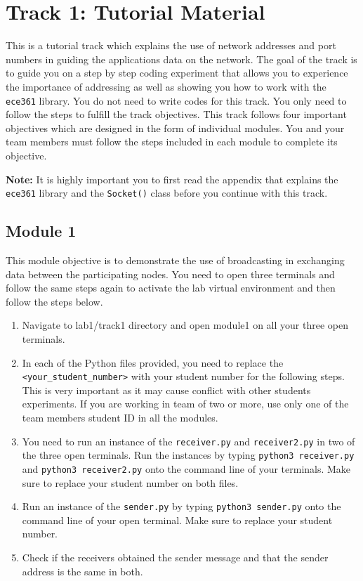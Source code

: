 \documentclass[11pt]{article}
\begin{document}
\section{Track 1: Tutorial Material}
\label{sec:track1}
This is a tutorial track which explains the use of network addresses and port numbers in guiding the applications data on the network. The goal of the track is to guide you on a step by step coding experiment that allows you to experience the importance of addressing as well as showing you how to work with the \texttt{ece361} library. You do not need to write codes for this track. You only need to follow the steps to fulfill the track objectives. This track follows four important objectives which are designed in the form of individual modules. You and your team members must follow the steps included in each module to complete its objective.

\textbf{Note:}
It is highly important you to first read the appendix that explains the \texttt{ece361} library and the \texttt{Socket()} class before you continue with this track.

\subsection{Module 1}
\label{subsec:module1}
This module objective is to demonstrate the use of broadcasting in exchanging data between the participating nodes. You need to open three terminals and follow the same steps again to activate the lab virtual environment and then follow the steps below.
\begin{enumerate}
    \item Navigate to lab1/track1 directory and open module1 on all your three open terminals.
    \item In each of the Python files provided, you need to replace the \texttt{<your\_student\_number>} with your student number for the following steps. This is very important as it may cause conflict with other students experiments. If you are working in team of two or more, use only one of the team members student ID in all the modules.
    \item You need to run an instance of the \texttt{receiver.py} and \texttt{receiver2.py} in two of the three open terminals. Run the instances by typing \texttt{python3 receiver.py} and \texttt{python3 receiver2.py} onto the command line of your terminals. Make sure to replace your student number on both files.
    \item Run an instance of the \texttt{sender.py} by typing \texttt{python3 sender.py} onto the command line of your open terminal. Make sure to replace your student number.
    \item Check if the receivers obtained the sender message and that the sender address is the same in both.
\end{enumerate}
\end{document}

